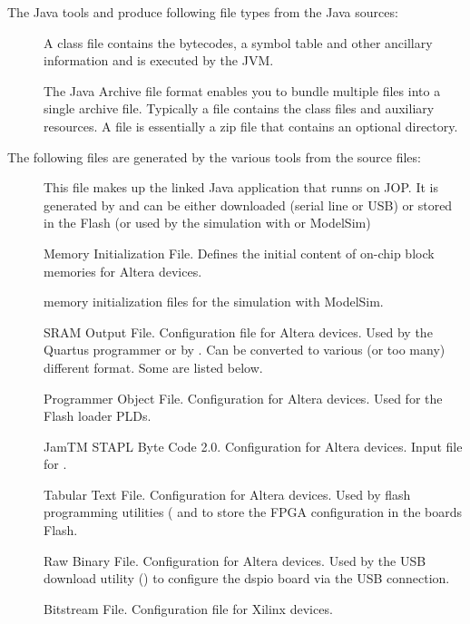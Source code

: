 The Java tools  and  produce following file types
from the Java sources:

\begin{description}

\item[] A class file contains the bytecodes, a symbol table and other
ancillary information and is executed by the JVM.

\item[] The Java Archive file format enables you to bundle multiple files
into a single archive file. Typically a  file contains
the class files and auxiliary resources. A  file is
essentially a zip file that contains an optional 
directory.

\end{description}

The following files are generated by the various tools from the
source files:

\begin{description}

\item[] This file makes up the linked Java application
    that runns on JOP. It is generated by  and can
    be either downloaded (serial line or USB) or stored in the
    Flash (or used by the simulation with  or
    ModelSim)

\item[] Memory Initialization File. Defines the initial
content of on-chip block memories for Altera devices.

\item[] memory initialization files for the simulation
with ModelSim.

\item[] SRAM Output File. Configuration file for Altera
devices. Used by the Quartus programmer or by .
Can be converted to various (or too many) different format. Some are
listed below.

\item[] Programmer Object File. Configuration for Altera
devices. Used for the Flash loader PLDs.

\item[] JamTM STAPL Byte Code 2.0. Configuration for Altera
devices. Input file for .

\item[] Tabular Text File. Configuration for Altera
devices. Used by flash programming utilities ( and
 to store the FPGA configuration in the boards Flash.

\item[] Raw Binary File. Configuration for Altera
devices. Used by the USB download utility () to
configure the dspio board via the USB connection.

\item[] Bitstream File. Configuration file for Xilinx
devices.

\end{description}

